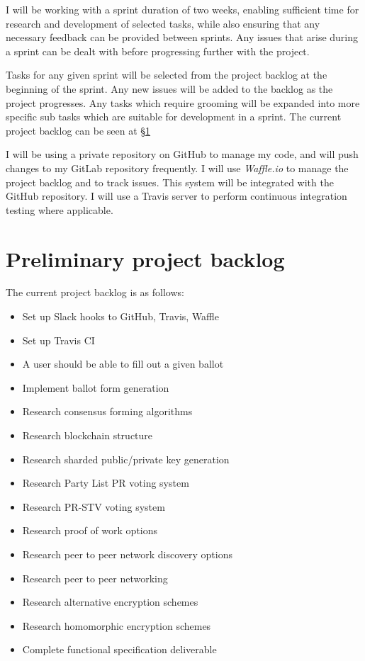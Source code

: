 \documentclass[a4paper,12pt]{article}
\begin{document}
I will be working with a sprint duration of two weeks, enabling sufficient time for research and development of selected tasks, while also ensuring that any necessary feedback can be provided between sprints. Any issues that arise during a sprint can be dealt with before progressing further with the project.

Tasks for any given sprint will be selected from the project backlog at the beginning of the sprint. Any new issues will be added to the backlog as the project progresses. Any tasks which require grooming will be expanded into more specific sub tasks which are suitable for development in a sprint. The current project backlog can be seen at \S\ref{sec:backlog}

I will be using a private repository on GitHub to manage my code, and will push changes to my GitLab repository frequently. I will use \textit{Waffle.io} to manage the project backlog and to track issues. This system will be integrated with the GitHub repository. I will use a Travis server to perform continuous integration testing where applicable.

\section{Preliminary project backlog}
\label{sec:backlog}

The current project backlog is as follows:
\begin{itemize}
    \item Set up Slack hooks to GitHub, Travis, Waffle
    \item Set up Travis CI
    \item A user should be able to fill out a given ballot
    \item Implement ballot form generation
    \item Research consensus forming algorithms
    \item Research blockchain structure
    \item Research sharded public/private key generation
    \item Research Party List PR voting system
    \item Research PR-STV voting system
    \item Research proof of work options
    \item Research peer to peer network discovery options
    \item Research peer to peer networking
    \item Research alternative encryption schemes
    \item Research homomorphic encryption schemes
    \item Complete functional specification deliverable
\end{itemize}
\newpage
\theendnotes
\end{document}
